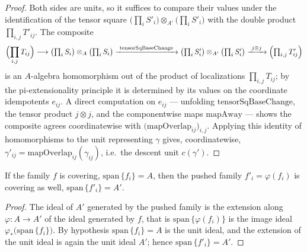 \begin{proof}
  \leanok
  Both sides are units, so it suffices to compare their values under the identification of the
  tensor square \(\bigl(\prod_i S'_i\bigr) \otimes_{A'} \bigl(\prod_i S'_i\bigr)\) with the
  double product \(\prod_{i,j} T'_{ij}\).  The composite
  \[
    \Bigl(\prod_{i,j} T_{ij}\Bigr) \longrightarrow \bigl(\textstyle\prod_i S_i\bigr) \otimes_A
    \bigl(\prod_i S_i\bigr) \xrightarrow{\ \mathrm{tensorSqBaseChange}\ } \bigl(\textstyle\prod_i
    S'_i\bigr) \otimes_{A'} \bigl(\prod_i S'_i\bigr) \xrightarrow{\ j \otimes j\ }
    \Bigl(\prod_{i,j} T'_{ij}\Bigr)
  \]
  is an \(A\)-algebra homomorphism out of the product of localizations \(\prod_{i,j} T_{ij}\);
  by the pi-extensionality principle it is determined by its values on the coordinate
  idempotents \(e_{ij}\).  A direct computation on \(e_{ij}\) — unfolding
  \(\mathrm{tensorSqBaseChange}\), the tensor product \(j \otimes j\), and the componentwise
  maps \(\mathrm{mapAway}\) — shows the composite agrees coordinatewise with
  \(\bigl(\mathrm{mapOverlap}_{ij}\bigr)_{i,j}\).  Applying this identity of homomorphisms to the
  unit representing \(\gamma\) gives, coordinatewise, \(\gamma'_{ij} =
  \mathrm{mapOverlap}_{ij}(\gamma_{ij})\), i.e.\ the descent unit \(c(\gamma')\).
\end{proof}

\begin{lemma}
  \label{pa-lem:awayCover_span_range_baseChange}
  \leanok

  If the family \(f\) is covering, \(\mathrm{span}\,\{f_i\} = A\), then the pushed family
  \(f'_i = \varphi(f_i)\) is covering as well, \(\mathrm{span}\,\{f'_i\} = A'\).
\end{lemma}
\begin{proof}
  \leanok
  The ideal of \(A'\) generated by the pushed family is the extension along \(\varphi \colon A
  \to A'\) of the ideal generated by \(f\), that is \(\mathrm{span}\,\{\varphi(f_i)\}\) is the
  image ideal \(\varphi_{*}\bigl(\mathrm{span}\,\{f_i\}\bigr)\).  By hypothesis
  \(\mathrm{span}\,\{f_i\} = A\) is the unit ideal, and the extension of the unit ideal is again
  the unit ideal \(A'\); hence \(\mathrm{span}\,\{f'_i\} = A'\).
\end{proof}

